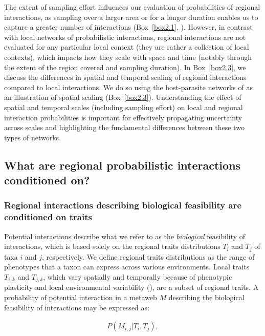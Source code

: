The extent of sampling effort influences our evaluation of probabilities of
regional interactions, as sampling over a larger area or for a longer duration
enables us to capture a greater number of interactions (Box~\ref{box2.1},
\cite{McLeod2021Sampling}). However, in contrast with local networks of
probabilistic interactions, regional interactions are not evaluated for any
particular local context (they are rather a collection of local contexts), which
impacts how they scale with space and time (notably through the extent of the
region covered and sampling duration). In Box~\ref{box2.3}, we discuss the
differences in spatial and temporal scaling of regional interactions compared to
local interactions. We do so using the host-parasite networks of
\cite{Kopelke2017Foodweb} as an illustration of spatial scaling
(Box~\ref{box2.3}). Understanding the effect of spatial and temporal scales
(including sampling effort) on local and regional interaction probabilities is
important for effectively propagating uncertainty across scales and highlighting
the fundamental differences between these two types of networks. 

\subsection{What are regional probabilistic interactions conditioned on?}

\subsubsection{Regional interactions describing biological feasibility are conditioned on traits}

Potential interactions describe what we refer to as the \textit{biological}
feasibility of interactions, which is based solely on the regional traits
distributions $T_i$ and $T_j$ of taxa $i$ and $j$, respectively. We define
regional traits distributions as the range of phenotypes that a taxon can
express across various environments. Local traits $T_{i,k}$ and $T_{j,k}$, which
vary spatially and temporally because of phenotypic plasticity and local
environmental variability (\cite{Berg2010Trait}), are a subset of regional
traits. A probability of potential interaction in a metaweb $M$ describing the
biological feasibility of interactions may be expressed as: 

\begin{eqnarray}
  \label{eq:metaweb}
  P(M_{i, j} | T_i, T_j),
\end{eqnarray}

